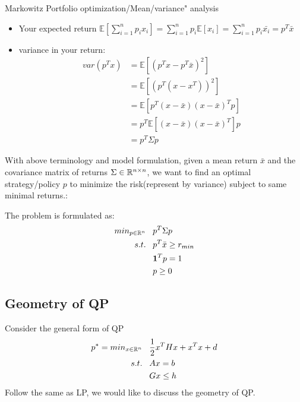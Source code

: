 \begin{example}{Markowitz Portfolio optimization/Mean/variance" analysis}
\begin{itemize}
		\item Your expected return $\mathbb{E}[\sum^n_{i=1}p_ix_i] = \sum^n_{i=1}p_i\mathbb{E}[x_i] = \sum^n_{i=1}p_i\bar{x_i} = p^T\bar{x}$
		
		\item variance in your return:
		\begin{align*}
		var(p^Tx) &=\mathbb{E}[(p^Tx - p^T\bar{x})^2]\\
		&= \mathbb{E}[(p^T(x - x^T))^2]\\
		&= \mathbb{E}[p^T(x - \bar{x})(x - \bar{x})^Tp]\\
		&= p^T\mathbb{E}[(x - \bar{x})(x - \bar{x})^T]p\\
		&= p^T\Sigma p
		\end{align*}
	\end{itemize}
	
	
	With above terminology and model formulation, given a mean return $\bar{x}$ and the covariance matrix of returns $\Sigma \in \mathbb{R}^{n\times n}$, we want to find an optimal strategy/policy $p$ to minimize the risk(represent by variance) subject to same minimal returns.: 
	
	The problem is formulated as:
	\begin{align*}
	min_{p\in \mathbb{R}^n}\,\,\,\,\, &p^T\Sigma p\\
	s.t. \,\,\,\,\,&p^T\bar{x}\geq r_{min}\\
	&\textbf{1}^Tp = 1\\
	&p\geq 0
	\end{align*}
\end{example}



\subsection{Geometry of QP}
Consider the general form of QP
\begin{align*}
p^* = min_{x\in \mathbb{R}^n}\,\,\,\,\, &\frac{1}{2}x^THx + x^Tx + d\\
s.t.\,\,\,\,\, &Ax = b\\
&Gx\leq h
\end{align*}
Follow the same as LP, we would like to discuss the geometry of QP.

